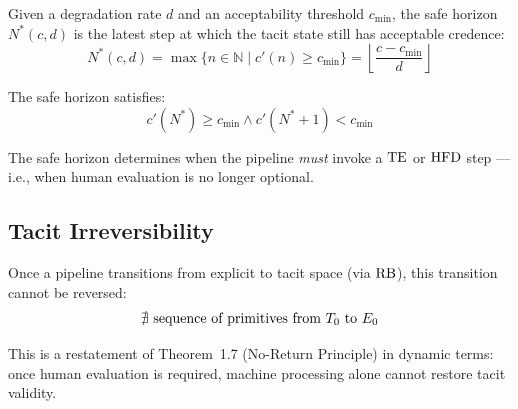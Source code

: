 \begin{definition}
Given a degradation rate $d$ and an acceptability threshold $c_{\min}$, the safe
horizon $N^*(c, d)$ is the latest step at which the tacit state still has
acceptable credence:
\[
  N^*(c, d) = \max\{n \in \mathbb{N} \mid c'(n) \geq c_{\min}\}
            = \left\lfloor \frac{c - c_{\min}}{d} \right\rfloor
\]
\end{definition}

\begin{theorem}
The safe horizon satisfies:
\[
  c'(N^*) \geq c_{\min} \wedge c'(N^*+1) < c_{\min}
\]
\end{theorem}

The safe horizon determines when the pipeline \emph{must} invoke a $\mathrm{TE}$ or
$\mathrm{HFD}$ step --- i.e., when human evaluation is no longer optional.

\subsection{Tacit Irreversibility}

\begin{theorem}
Once a pipeline transitions from explicit to tacit space (via $\mathrm{RB}$), this
transition cannot be reversed:
\[
  \nexists\ \text{sequence of primitives from } T_0 \text{ to } E_0
\]
\end{theorem}

This is a restatement of Theorem~1.7 (No-Return Principle) in dynamic terms:
once human evaluation is required, machine processing alone cannot restore
tacit validity.
